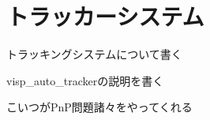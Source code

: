 \section{トラッカーシステム}
\label{proposed_tracker}
トラッキングシステムについて書く

visp\_auto\_trackerの説明を書く

こいつがPnP問題諸々をやってくれる
